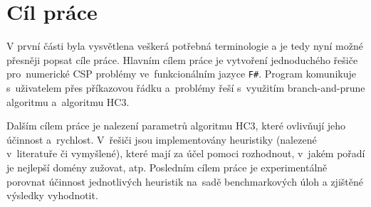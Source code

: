 \chapter{Cíl práce}
V první části byla vysvětlena veškerá potřebná terminologie a je tedy nyní možné přesněji popsat cíle práce. Hlavním cílem práce je vytvoření jednoduchého řešiče pro~numerické CSP problémy ve~funkcionálním jazyce \texttt{F\#}. Program komunikuje s~uživatelem přes příkazovou řádku a~problémy řeší s~využitím branch-and-prune algoritmu a~algoritmu HC3.

Dalším cílem práce je nalezení parametrů algoritmu HC3, které ovlivňují jeho účinnost a~rychlost. V~řešiči jsou implementovány heuristiky (nalezené v~literatuře či vymyšlené), které mají za účel pomoci rozhodnout, v~jakém pořadí je nejlepší domény zužovat, atp. Posledním cílem práce je experimentálně porovnat účinnost jednotlivých heuristik na~sadě benchmarkových úloh a zjištěné výsledky vyhodnotit.